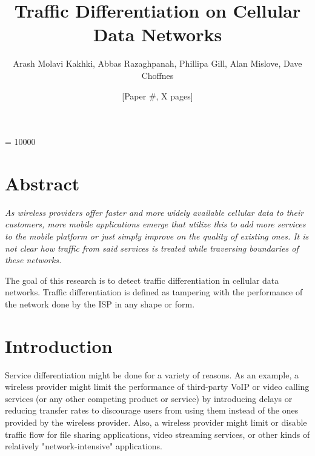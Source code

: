 \documentclass[letterpaper]{sig-alternate-10pt}
\title{Traffic Differentiation on Cellular Data Networks}
\author{Arash Molavi Kakhki, Abbas Razaghpanah, Phillipa Gill, Alan Mislove, Dave Choffnes}
\author{[Paper \#, X pages]}
\begin{document}

\widowpenalty = 10000

\maketitle

\section*{Abstract}
{\it
As wireless providers offer faster and more widely available cellular data to their customers, more mobile applications emerge that utilize this to add more services to the mobile platform or just simply improve on the quality of existing ones. It is not clear how traffic from said services is treated while traversing boundaries of these networks.

The goal of this research is to detect traffic differentiation in cellular data networks. Traffic differentiation is defined as tampering with the performance of the network done by the ISP in any shape or form.
}

\section{Introduction}

Service differentiation might be done for a variety of reasons. As an example, a wireless provider might limit the performance of third-party VoIP or video calling services (or any other competing product or service) by introducing delays or reducing transfer rates to discourage users from using them instead of the ones provided by the wireless provider. Also, a wireless provider might limit or disable traffic flow for file sharing applications, video streaming services, or other kinds of relatively "network-intensive" applications.
\end{document}
